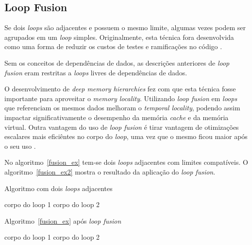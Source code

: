 
\subsection{Loop Fusion}

Se dois \textit{loops} são adjacentes e possuem o mesmo limite, algumas vezes
podem ser agrupados em um \textit{loop} simples.
Originalmente, esta técnica fora desenvolvida como uma forma de reduzir os
custos de testes e ramificações no código \cite{Wolf:1996}.

Sem os conceitos de dependências de dados, as descrições anteriores de
\textit{loop fusion} eram restritas a \textit{loops} livres de dependências de
dados. 

O desenvolvimento de \textit{deep memory hierarchies} fez com que esta técnica
fosse importante para aproveitar o \textit{memory locality}.
Utilizando \textit{loop fusion} em \textit{loops} que referenciam os mesmos
dados melhoram o \textit{temporal locality}, podendo assim impactar 
significativamente o desempenho da memória \textit{cache} e da memória virtual.
Outra vantagem do uso de \textit{loop fusion} é tirar vantagem de otimizações 
escalares mais eficiêntes no corpo do \textit{loop}, uma vez que o mesmo ficou
maior após o seu uso \cite{McKinley:1996} \cite{Rivera:1999}.

No algoritmo~\ref{fusion_ex} tem-se dois \textit{loops} adjacentes com limites
compatíveis. 
O algoritmo~\ref{fusion_ex2} mostra o resultado da aplicação do 
\textit{loop fusion}.

\begin{algorithm}
\caption{Algoritmo com dois \textit{loops} adjacentes}
\label{fusion_ex}
\begin{algorithmic}[1]

\STATE corpo do loop 1
\ENDFOR
{}
\STATE corpo do loop 2
\ENDFOR

\end{algorithmic}
\end{algorithm}

\begin{algorithm}
\caption{Algoritmo~\ref{fusion_ex} após \textit{loop fusion}}
\label{fusion_ex2}
\begin{algorithmic}[1]

\STATE corpo do loop 1
\STATE corpo do loop 2
\ENDFOR

\end{algorithmic}
\end{algorithm}

